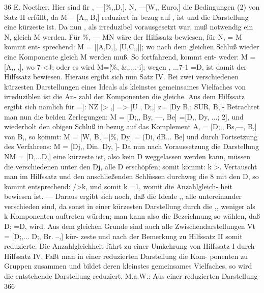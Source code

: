 \documentclass[11pt,a4paper]{article}
\theoremstyle{plain}
\theoremstyle{definition}
\begin{document}
36 
E. Noether. 
Hier sind fir , ---[\%,,D,], N, ---[W,, Euro,] die Bedingungen (2) von 
Satz II erfüllt, 
da M--- [A,, B,] reduziert 
in bezug auf , ist und die 
Darstellung 
eine kürzeste 
ist. 
Da nun , als irreduzibel vorausgesetzt 
war, muß notwendig ein N, gleich M werden. 
Für \%, --- MN wäre der Hilfssatz bewiesen, 
für N, = M kommt ent- 
sprechend: M = [[A,D,], [U,C,,]]; wo nach dem gleichen Schluß wieder 
eine Komponente 
gleich M werden muß. 
So fortfahrend, kommt ent- 
weder: M = [A,, ,], wo 7 <J; oder es wird M=[\%, \&,....-i]; wegen 
, ...7-1 =D, ist damit der Hilfssatz bewiesen. 
Hieraus ergibt sich nun 
Satz IV. 
Bei zwei verschiedenen 
kürzesten Darstellungen 
eines 
Ideals als kleinstes gemeinsames Vielfaches von irreduziblen ist die An- 
zahl der Komponenten die gleiche. 
Aus dem Hilfssatz ergibt sich nämlich für =]: 
NZ [> ,] => [U , D;,] z= [Dy B,; SUR, B,]- 
Betrachtet man nun die beiden Zerlegungen: 
M = [D;,, By, ---, Be] =[D,, Dy, ...; 2], 
und 
wiederholt 
den 
obigen 
Schluß 
in bezug 
auf 
das Komplement 
A, = [D;,, Bs,---, B,] von B,, so kommt: 
M = [W, B,]=[\%, Dy] = (Di, dB... Be] 
und durch Fortsetzung des Verfahrens: 
M = [Dj,, Din. Dy, ]- 
Da nun nach Voraussetzung die Darstellung 
NM = [D,...D,] eine kürzeste 
ist, also kein D weggelassen werden kann, müssen die verschiedenen unter 
den Dj, alle D erschöpfen; 
somit kommt: 
k 
>. 
Vertauscht man im 
Hilfssatz und den anschließenden Schlüssen durchweg die 8 mit den D, 
so kommt entsprechend: />k, und somit k =1, womit die Anzahlgleich- 
heit bewiesen 
ist. --- 
Daraus ergibt sich noch, daß die Ideale ,, alle 
untereinander verschieden 
sind, da sonst in einer kürzesten Darstellung 
durch die ,, weniger als k Komponenten auftreten würden; man kann also 
die Bezeichnung so wählen, daß D; =D, wird. 
Aus dem gleichen Grunde 
sind auch alle Zwischendarstellungen Vt = [D;,... D;, Br. --,] kür- 
zeste und nach der Bemerkung zu Hilfssatz II somit reduzierte. 
Die Anzahlgleichheit führt zu einer Umkehrung von Hilfssatz I durch 
Hilfssatz IV. Faßt man in einer reduzierten Darstellung die Kom- 
ponenten zu Gruppen zusammen und bildet deren kleinstes gemeinsames 
Vielfaches, so wird die entstehende Darstellung reduziert. 
M.a.W.: Aus 
einer reduzierten Darstellung 
366
\end{document}
